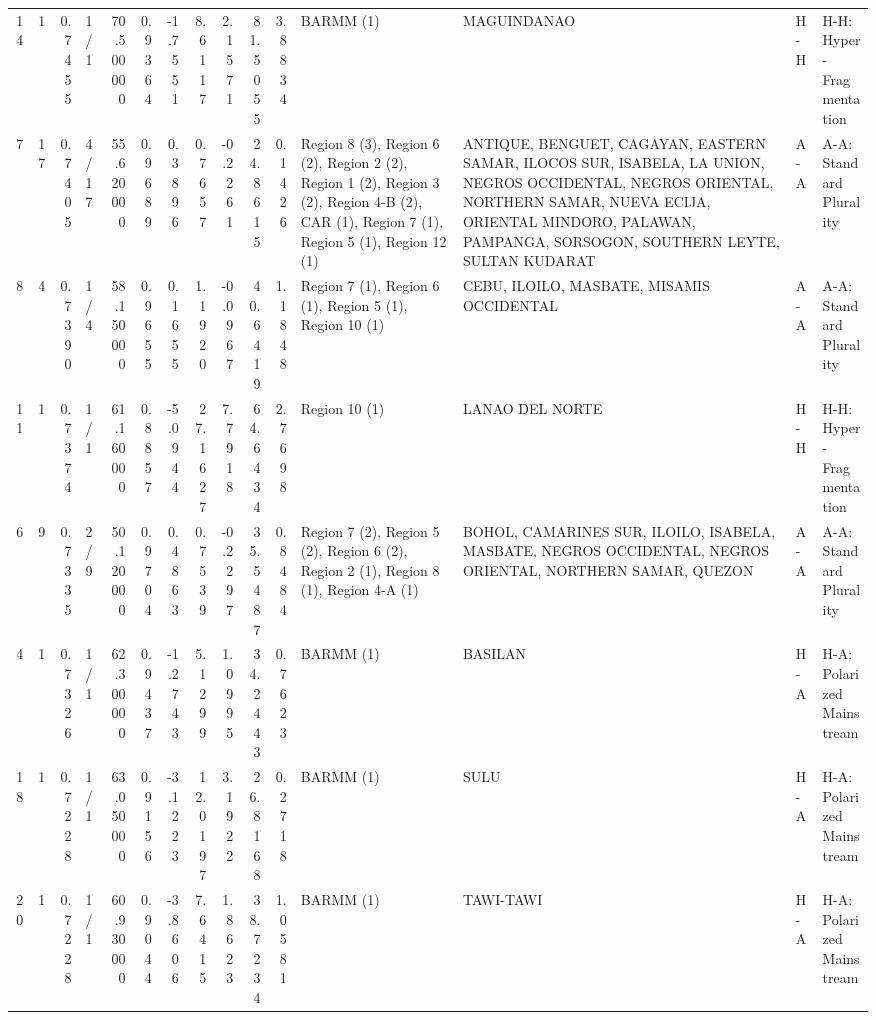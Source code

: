 \begin{tabular}{rrrlrrrrrrrllll}
14 & 1 & {\cellcolor[HTML]{ABC8FD}} \color[HTML]{000000} 0.7455 & 1/1 & {\cellcolor[HTML]{B40426}} \color[HTML]{F1F1F1} 70.500000 & 0.9364 & -1.7551 & 8.6117 & 2.1571 & 81.5055 & 3.8834 & BARMM (1) & MAGUINDANAO & H-H & H-H: Hyper-Fragmentation \\
7 & 17 & {\cellcolor[HTML]{A2C1FF}} \color[HTML]{000000} 0.7405 & 4/17 & {\cellcolor[HTML]{C3D5F4}} \color[HTML]{000000} 55.620000 & 0.9689 & 0.3896 & 0.7657 & -0.2261 & 24.8615 & 0.1426 & Region 8 (3), Region 6 (2), Region 2 (2), Region 1 (2), Region 3 (2), Region 4-B (2), CAR (1), Region 7 (1), Region 5 (1), Region 12 (1) & ANTIQUE, BENGUET, CAGAYAN, EASTERN SAMAR, ILOCOS SUR, ISABELA, LA UNION, NEGROS OCCIDENTAL, NEGROS ORIENTAL, NORTHERN SAMAR, NUEVA ECIJA, ORIENTAL MINDORO, PALAWAN, PAMPANGA, SORSOGON, SOUTHERN LEYTE, SULTAN KUDARAT & A-A & A-A: Standard Plurality \\
8 & 4 & {\cellcolor[HTML]{9EBEFF}} \color[HTML]{000000} 0.7390 & 1/4 & {\cellcolor[HTML]{DFDBD9}} \color[HTML]{000000} 58.150000 & 0.9655 & 0.1655 & 1.1920 & -0.0967 & 40.6419 & 1.1848 & Region 7 (1), Region 6 (1), Region 5 (1), Region 10 (1) & CEBU, ILOILO, MASBATE, MISAMIS OCCIDENTAL & A-A & A-A: Standard Plurality \\
11 & 1 & {\cellcolor[HTML]{9BBCFF}} \color[HTML]{000000} 0.7374 & 1/1 & {\cellcolor[HTML]{F5C4AC}} \color[HTML]{000000} 61.160000 & 0.8857 & -5.0944 & 27.1627 & 7.7918 & 64.6434 & 2.7698 & Region 10 (1) & LANAO DEL NORTE & H-H & H-H: Hyper-Fragmentation \\
6 & 9 & {\cellcolor[HTML]{93B5FE}} \color[HTML]{000000} 0.7335 & 2/9 & {\cellcolor[HTML]{779AF7}} \color[HTML]{F1F1F1} 50.120000 & 0.9704 & 0.4863 & 0.7539 & -0.2297 & 35.5487 & 0.8484 & Region 7 (2), Region 5 (2), Region 6 (2), Region 2 (1), Region 8 (1), Region 4-A (1) & BOHOL, CAMARINES SUR, ILOILO, ISABELA, MASBATE, NEGROS OCCIDENTAL, NEGROS ORIENTAL, NORTHERN SAMAR, QUEZON & A-A & A-A: Standard Plurality \\
4 & 1 & {\cellcolor[HTML]{90B2FE}} \color[HTML]{000000} 0.7326 & 1/1 & {\cellcolor[HTML]{F7B599}} \color[HTML]{000000} 62.300000 & 0.9437 & -1.2743 & 5.1299 & 1.0995 & 34.2443 & 0.7623 & BARMM (1) & BASILAN & H-A & H-A: Polarized Mainstream \\
18 & 1 & {\cellcolor[HTML]{7B9FF9}} \color[HTML]{F1F1F1} 0.7228 & 1/1 & {\cellcolor[HTML]{F7AA8C}} \color[HTML]{000000} 63.050000 & 0.9156 & -3.1223 & 12.0197 & 3.1922 & 26.8168 & 0.2718 & BARMM (1) & SULU & H-A & H-A: Polarized Mainstream \\
20 & 1 & {\cellcolor[HTML]{7B9FF9}} \color[HTML]{F1F1F1} 0.7228 & 1/1 & {\cellcolor[HTML]{F4C6AF}} \color[HTML]{000000} 60.930000 & 0.9044 & -3.8606 & 7.6415 & 1.8623 & 38.7234 & 1.0581 & BARMM (1) & TAWI-TAWI & H-A & H-A: Polarized Mainstream \\

\end{tabular}
